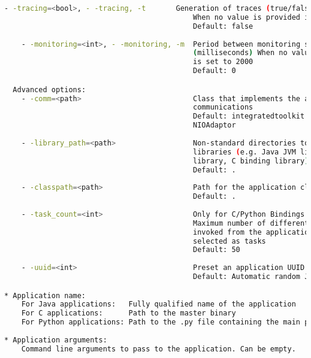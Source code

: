 \begin{lstlisting}[language=bash]
    - -tracing=<bool>, - -tracing, -t       Generation of traces (true/false)
                                            When no value is provided it is set to true
                                            Default: false
                                            
    - -monitoring=<int>, - -monitoring, -m  Period between monitoring samples 
                                            (milliseconds) When no value is provided it 
                                            is set to 2000
                                            Default: 0

  Advanced options:
    - -comm=<path>                          Class that implements the adaptor for 
                                            communications
                                            Default: integratedtoolkit.nio.master.
                                            NIOAdaptor
                                            
    - -library_path=<path>                  Non-standard directories to search for 
                                            libraries (e.g. Java JVM library, Python 
                                            library, C binding library) 
                                            Default: .
                                            
    - -classpath=<path>                     Path for the application classes / modules
                                            Default: .
                                            
    - -task_count=<int>                     Only for C/Python Bindings. 
                                            Maximum number of different functions/methods
                                            invoked from the application that have been 
                                            selected as tasks
                                            Default: 50
                                            
    - -uuid=<int>                           Preset an application UUID
                                            Default: Automatic random Jobs.texgeneration

* Application name:
    For Java applications:   Fully qualified name of the application
    For C applications:      Path to the master binary
    For Python applications: Path to the .py file containing the main program
    
* Application arguments:
    Command line arguments to pass to the application. Can be empty. 
                                            
\end{lstlisting}

